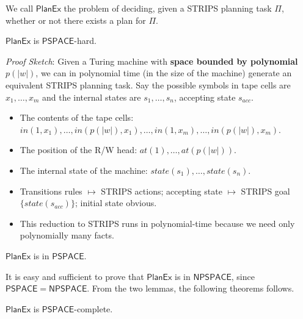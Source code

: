 \documentclass[10pt, letterpaper]{report}
\begin{document}
We call $\mathsf{PlanEx}$ the problem of deciding, given a STRIPS planning task $\Pi$, whether or not there exists a plan for  $\Pi$.
\begin{lemma2}
    $\mathsf{PlanEx}$ is $\mathsf{PSPACE}$-hard.
\end{lemma2}
\textit{Proof Sketch}:
Given a Turing machine with \textbf{space bounded by polynomial $p(|w|)$}, we can in polynomial time (in the size of the machine) generate an equivalent STRIPS planning task. Say the possible symbols in tape cells are $x_1, \dots, x_m$ and the internal states are $s_1, \dots, s_n$, accepting state $s_{acc}$.
\begin{itemize}
    \item The contents of the tape cells: $in(1, x_1), \dots, in(p(|w|), x_1), \dots, in(1, x_m), \dots, in(p(|w|), x_m)$.
    \item The position of the R/W head: $at(1), \dots, at(p(|w|))$.
    \item The internal state of the machine: $state(s_1), \dots, state(s_n)$.
    \item Transitions rules $\mapsto$ STRIPS actions; accepting state $\mapsto$ STRIPS goal $\{state(s_{acc})\}$; initial state obvious.
    \item This reduction to STRIPS runs in polynomial-time because we need only polynomially many facts.
\end{itemize}
\begin{lemma2}
    $\mathsf{PlanEx}$ is in $\mathsf{PSPACE}$.
\end{lemma2}
It is easy and sufficient to prove that $\mathsf{PlanEx}$ is in $\mathsf{NPSPACE}$, since $\mathsf{PSPACE}=\mathsf{NPSPACE}$. From the two lemmas, the following theorems follows.
\begin{theorem}
    $\mathsf{PlanEx}$ is $\mathsf{PSPACE}$-complete.
\end{theorem}
\end{document}
